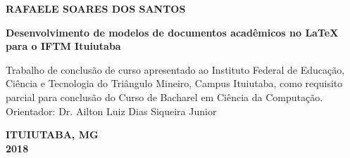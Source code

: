\newpage
\thispagestyle{empty}

\begin{center}
\textbf{RAFAELE SOARES DOS SANTOS}

\vspace*{3 cm}

\textbf{Desenvolvimento de modelos de documentos acadêmicos no LaTeX para o IFTM Ituiutaba}
\end{center}

\vspace*{3 cm}

\hfill
\begin{minipage}{8cm}
Trabalho de conclusão de curso apresentado ao Instituto Federal de Educação, Ciência e Tecnologia do Triângulo Mineiro, Campus Ituiutaba, como requisito parcial para conclusão do Curso de Bacharel em Ciência da Computação.\\

Orientador: Dr. Ailton Luiz Dias Siqueira Junior\\
\end{minipage}

\vspace*{8.5 cm}

\begin{center}
\textbf{ITUIUTABA, MG\\2018}
\end{center}